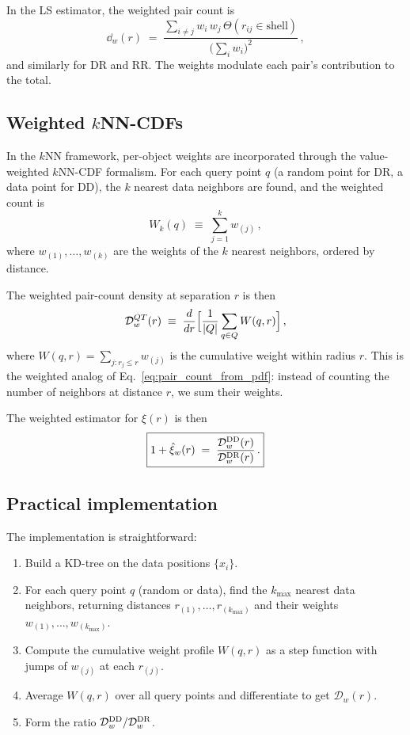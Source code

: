 In the LS estimator, the weighted pair count is
\begin{equation}
  \dd_w(r) \;=\; \frac{\sum_{i \neq j} w_i\,w_j\,\Theta(r_{ij} \in \text{shell})}{\bigl(\sum_i w_i\bigr)^2}\,,
  \label{eq:DD_weighted}
\end{equation}
and similarly for DR and RR.  The weights modulate each pair's contribution to the total.

\subsection{Weighted $k$NN-CDFs}
\label{sec:weighted_knn}

In the $k$NN framework, per-object weights are incorporated through the value-weighted $k$NN-CDF formalism.  For each query point $q$ (a random point for DR, a data point for DD), the $k$ nearest data neighbors are found, and the weighted count is
\begin{equation}
  W_k(q) \;\equiv\; \sum_{j=1}^{k} w_{(j)}\,,
  \label{eq:weighted_count}
\end{equation}
where $w_{(1)}, \ldots, w_{(k)}$ are the weights of the $k$ nearest neighbors, ordered by distance.

The weighted pair-count density at separation $r$ is then
\begin{equation}
  \mathcal{D}^{QT}_w(r) \;\equiv\; \frac{d}{dr}\Bigl[\frac{1}{|Q|}\sum_{q \in Q} W(q, r)\Bigr]\,,
  \label{eq:D_weighted}
\end{equation}
where $W(q, r) = \sum_{j: r_j \leq r} w_{(j)}$ is the cumulative weight within radius $r$.  This is the weighted analog of Eq.~\eqref{eq:pair_count_from_pdf}: instead of counting the number of neighbors at distance $r$, we sum their weights.

The weighted estimator for $\xi(r)$ is then
\begin{equation}
  \boxed{1 + \hat{\xi}_w(r) \;=\; \frac{\mathcal{D}^{\mathrm{DD}}_w(r)}{\mathcal{D}^{\mathrm{DR}}_w(r)}\,.}
  \label{eq:xi_weighted}
\end{equation}

\subsection{Practical implementation}
\label{sec:weight_implementation}

The implementation is straightforward:
\begin{enumerate}[nosep]
  \item Build a KD-tree on the data positions $\{x_i\}$.
  \item For each query point $q$ (random or data), find the $k_{\max}$ nearest data neighbors, returning distances $r_{(1)}, \ldots, r_{(k_{\max})}$ and their weights $w_{(1)}, \ldots, w_{(k_{\max})}$.
  \item Compute the cumulative weight profile $W(q, r)$ as a step function with jumps of $w_{(j)}$ at each $r_{(j)}$.
  \item Average $W(q, r)$ over all query points and differentiate to get $\mathcal{D}_w(r)$.
  \item Form the ratio $\mathcal{D}^{\mathrm{DD}}_w / \mathcal{D}^{\mathrm{DR}}_w$.
\end{enumerate}

